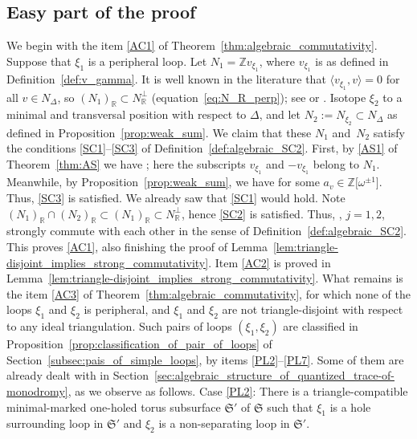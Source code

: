 \documentclass[10pt,a4paper]{amsart}
\numberwithin{equation}{section}
\theoremstyle{definition}
\begin{document}
\subsection{Easy part of the proof}\label{subsec:easy_part}
We begin with the item \ref{AC1} of Theorem~\ref{thm:algebraic_commutativity}.
Suppose that $\xi_1$ is a peripheral loop. Let $N_1 = \mathbb{Z} v_{\xi_1}$, where $v_{\xi_1}$ is as defined in Definition~\ref{def:v_gamma}. It is well known in the literature that $\langle v_{\xi_1}, v\rangle=0$ for all $v\in N_\Delta$, so $(N_1)_\mathbb{R} \subset N_\mathbb{R}^\perp$ (equation~\eqref{eq:N_R_perp}); see \cite[Lemma~8]{BL07} or \cite[Lemma~3.9]{AK}. Isotope $\xi_2$ to a minimal and transversal position with respect to $\Delta$, and let $N_2 := N_{\xi_2} \subset N_\Delta$ as defined in Proposition~\ref{prop:weak_sum}. We claim that these $N_1$ and~$N_2$ satisfy the conditions \ref{SC1}--\ref{SC3} of Definition~\ref{def:algebraic_SC2}. First, by \ref{AS1} of Theorem~\ref{thm:AS} we have ; here the subscripts $v_{\xi_1}$ and $-v_{\xi_1}$ belong to $N_1$. Meanwhile, by Proposition~\ref{prop:weak_sum}, we have  for some $a_v\in \mathbb{Z}\bigl[\omega^{\pm 1}\bigr]$. Thus, \ref{SC3} is satisfied. We already saw that \ref{SC1} would hold. Note $(N_1)_\mathbb{R} \cap (N_2)_\mathbb{R} \subset (N_1)_\mathbb{R} \subset N_\mathbb{R}^\perp$, hence \ref{SC2} is satisfied. Thus, , $j=1,2$, strongly commute with each other in the sense of Definition~\ref{def:algebraic_SC2}. This proves \ref{AC1}, also finishing the proof of Lemma~\ref{lem:triangle-disjoint_implies_strong_commutativity}.
Item \ref{AC2} is proved in Lemma~\ref{lem:triangle-disjoint_implies_strong_commutativity}.
What remains is the item \ref{AC3} of Theorem~\ref{thm:algebraic_commutativity}, for which none of the loops $\xi_1$ and $\xi_2$ is peripheral, and $\xi_1$ and $\xi_2$ are not triangle-disjoint with respect to any ideal triangulation. Such pairs of loops $(\xi_1,\xi_2)$ are classified in Proposition~\ref{prop:classification_of_pair_of_loops} of Section~\ref{subsec:pais_of_simple_loops}, by items \ref{PL2}--\ref{PL7}. Some of them are already dealt with in Section~\ref{sec:algebraic_structure_of_quantized_trace-of-monodromy}, as we observe as follows.
Case {\ref{PL2}}: There is a triangle-compatible minimal-marked one-holed torus subsurface $\mathfrak{S}'$ of $\mathfrak{S}$ such that $\xi_1$ is a hole surrounding loop in $\mathfrak{S}'$ and $\xi_2$ is a non-separating loop in $\mathfrak{S}'$.
\end{document}
